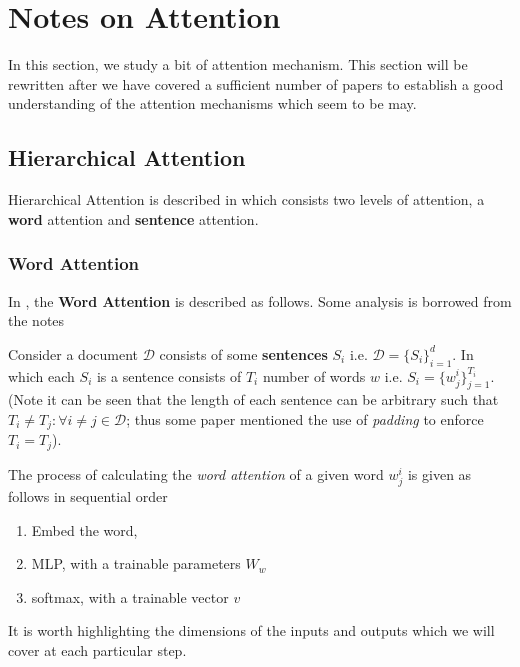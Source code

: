 \section{Notes on Attention}\label{sec:attention_mechanism}
In this section, we study a bit of attention mechanism. This section will be rewritten after we have covered a sufficient number of papers to establish a good understanding of the attention mechanisms which seem to be may. 

\subsection{Hierarchical Attention \cite{HAN_paper}}

Hierarchical Attention is described in \cite{HAN_paper} which consists two levels of attention, a \textbf{word} attention and \textbf{sentence} attention.

\subsubsection{Word Attention}
In \cite{HAN_paper}, the \textbf{Word Attention} is described as follows. Some analysis is borrowed from the notes \cite{HAN_math_notes}

Consider a document $\mathcal{D}$ consists of some \textbf{sentences} $S_i$ i.e. $\mathcal{D} = \{S_i\}_{i=1}^d$. In which each $S_i$ is a sentence consists of $T_i$ number of words $w$ i.e. $S_i = \{w^i_j \}_{j=1}^{T_i}$. (Note it can be seen that the length of each sentence can be arbitrary such that $T_i \neq T_j: \forall i \neq j \in \mathcal{D}$; thus some paper mentioned the use of \textit{padding} to enforce $T_i = T_j$).

The process of calculating the \textit{word attention} of a given word $w^i_j$ is given as follows in sequential order
\begin{enumerate}
    \item Embed the word,
    \item MLP, with a trainable parameters $W_w$
    \item softmax, with a trainable vector $v$
\end{enumerate}
It is worth highlighting the dimensions of the inputs and outputs which we will cover at each particular step.

